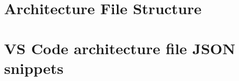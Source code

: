\appendixpage
\noappendicestocpagenum
\addappheadtotoc
\chapter{Architecture File Structure}
\label{appen:architecture-file-structure}


\chapter{VS Code architecture file JSON snippets}
\label{appen:vscode_snippets}

